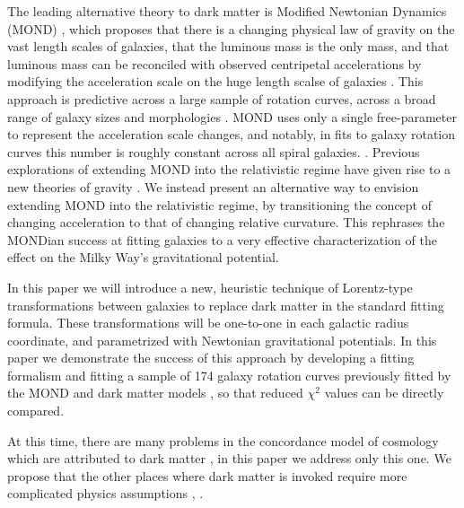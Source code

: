 \documentclass[reprint,%
 amsmath,amssymb,
 aps,
]{revtex4-1}
\begin{document}
 
  
    
  The leading   alternative theory  to dark matter is Modified Newtonian Dynamics (MOND) \cite{Milgrom}, which  proposes    
  that there is  a changing  physical law of gravity    on the vast length scales of galaxies, that the   luminous mass is the only mass, and that luminous mass can be reconciled with observed centripetal accelerations by modifying the acceleration scale on the huge length scalse of galaxies
  \cite{McGaugh_2014}. 
  This approach  is   predictive across a large sample of  rotation curves,   across a broad   range  of galaxy sizes and morphologies \cite{2016Lelli}. 
  MOND uses only   a single free-parameter to represent the acceleration scale changes, and notably,  in fits to  galaxy rotation curves this number is  roughly constant   across   all spiral   galaxies.  \cite{McGaugh2016RAR,2022A&A...664A..40M}. 
  Previous explorations of  extending MOND into the relativistic regime have given rise to a new theories of gravity  \cite{PhysRevD.70.083509,doi:10.1142/S0217751X0703666X}.  We instead
  present an alternative way to envision extending MOND into the relativistic regime, by 
  transitioning the concept of  changing acceleration   to   that of  changing   relative curvature.   
This rephrases  the     MONDian success at fitting galaxies   to a very effective characterization
  of the effect on the  Milky Way's gravitational potential.
   
 
 
 
 


   
     In this paper we will introduce a new, heuristic technique of  Lorentz-type   transformations     between galaxies to replace dark matter in the standard fitting formula.   These transformations will be  one-to-one in each galactic radius coordinate,   and parametrized with Newtonian gravitational potentials. 
      In this paper we demonstrate the success of this approach by developing a fitting formalism and fitting   a sample of 174 galaxy rotation curves previously fitted by the MOND and dark matter models  \cite{McGaugh2016RAR,2016Lelli}, so that reduced $\chi^2$ values can be directly compared.  
      
   At this time, there are many problems in   the concordance model of   cosmology which are attributed to dark matter \cite{2010dmp..book.....S}, in
 this paper we address only this  one. 
      We propose   that the other places  where dark matter is invoked     require more complicated  physics assumptions 
      \cite{Tully:2014gfa},
      \cite{Naidu_2022}. 
      
\end{document}
